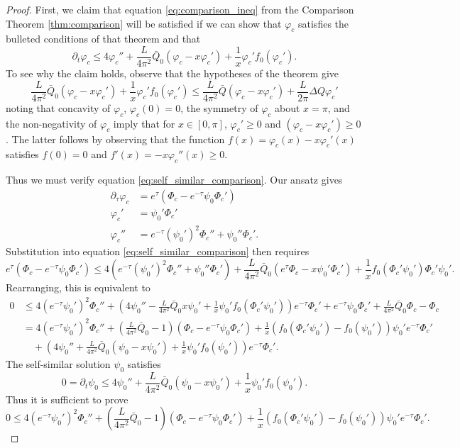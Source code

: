 \documentclass[11pt]{amsart}
\begin{document}
\begin{proof}
First, we claim that equation \eqref{eq:comparison_ineq} from the Comparison Theorem \ref{thm:comparison} will be satisfied if we can show that $\varphi_c$ satisfies the bulleted conditions of that theorem and that
\begin{equation}
\label{eq:self_similar_comparison}
\partial_t \varphi_c \leq 4 \varphi_c'' + \frac{L}{4\pi^2} \bar{Q}_0 (\varphi_c - x\varphi_c') + \frac{1}{x} \varphi_c' f_0 (\varphi_c').
\end{equation}
To see why the claim holds, observe that the hypotheses of the theorem give
\[
\frac{L}{4\pi^2} \bar{Q}_0 (\varphi_c - x\varphi_c') + \frac{1}{x} \varphi_c' f_0 (\varphi_c') \leq \frac{L}{4\pi^2} \bar{Q} (\varphi_c - x\varphi_c') + \frac{L}{2\pi} \Delta Q \varphi_c'
\]
noting that concavity of $\varphi_c$, $\varphi_c(0) = 0$, the symmetry of $\varphi_c$ about $x=\pi$, and the non-negativity of $\varphi_c$ imply that for $x \in [0, \pi]$, $\varphi_c' \geq 0$ and $(\varphi_c - x \varphi_c') \geq 0$. The latter follows by observing that the function $f(x) = \varphi_c(x) - x \varphi_c'(x)$ satisfies $f(0) = 0$ and $f'(x) = -x \varphi_c''(x) \geq 0$.

Thus we must verify equation \eqref{eq:self_similar_comparison}. Our ansatz gives
\begin{align*}
\partial_{\tau} \varphi_c &= e^{\tau} \left(\Phi_c - e^{-\tau} \psi_0 \Phi_c'\right) \\
\varphi_c' &= \psi_0' \Phi_c' \\
\varphi_c'' &= e^{-\tau} (\psi_0')^2 \Phi_c'' + \psi_0'' \Phi_c'.
\end{align*}
Substitution into equation \eqref{eq:self_similar_comparison} then requires
\[
e^{\tau} \left(\Phi_c - e^{-\tau} \psi_0 \Phi_c'\right) \leq 4 \left(e^{-\tau} (\psi_0')^2 \Phi_c'' + \psi_0'' \Phi_c'\right) + \frac{L}{4\pi^2} \bar{Q}_0 (e^{\tau} \Phi_c - x \psi_0' \Phi_c') + \frac{1}{x} f_0(\Phi_c' \psi_0') \Phi_c' \psi_0'.
\]
Rearranging, this is equivalent to
\[
\begin{split}
0 &\leq 4 (e^{-\tau} \psi_0')^2 \Phi_c'' + \left(4\psi_0'' - \frac{L}{4\pi^2} \bar{Q}_0 x \psi_0' + \frac{1}{x} \psi_0'f_0(\Phi_c' \psi_0') \right) e^{-\tau} \Phi_c' + e^{-\tau} \psi_0 \Phi_c' + \frac{L}{4\pi^2} \bar{Q}_0 \Phi_c - \Phi_c \\
&= 4 (e^{-\tau} \psi_0')^2 \Phi_c'' + \left(\frac{L}{4\pi^2} \bar{Q}_0 - 1\right) \left(\Phi_c - e^{-\tau} \psi_0 \Phi_c'\right) + \frac{1}{x} \left(f_0(\Phi_c' \psi_0') - f_0(\psi_0')\right) \psi_0' e^{-\tau} \Phi_c'\\
&\quad + \left(4\psi_0'' + \frac{L}{4\pi^2} \bar{Q}_0 (\psi_0 - x \psi_0') + \frac{1}{x} \psi_0' f_0(\psi_0')\right) e^{-\tau} \Phi_c'.
\end{split}
\]
The self-similar solution $\psi_0$ satisfies
\[
0 = \partial_t \psi_0 \leq 4\psi_0'' + \frac{L}{4\pi^2} \bar{Q}_0 (\psi_0 - x \psi_0') + \frac{1}{x} \psi_0' f_0(\psi_0').
\]
Thus it is sufficient to prove
\[
0 \leq 4 (e^{-\tau} \psi_0')^2 \Phi_c'' + \left(\frac{L}{4\pi^2} \bar{Q}_0 - 1\right) \left(\Phi_c - e^{-\tau} \psi_0 \Phi_c'\right) + \frac{1}{x} \left(f_0(\Phi_c' \psi_0') - f_0(\psi_0')\right) \psi_0' e^{-\tau} \Phi_c'.
\]


\end{proof}
\end{document}
